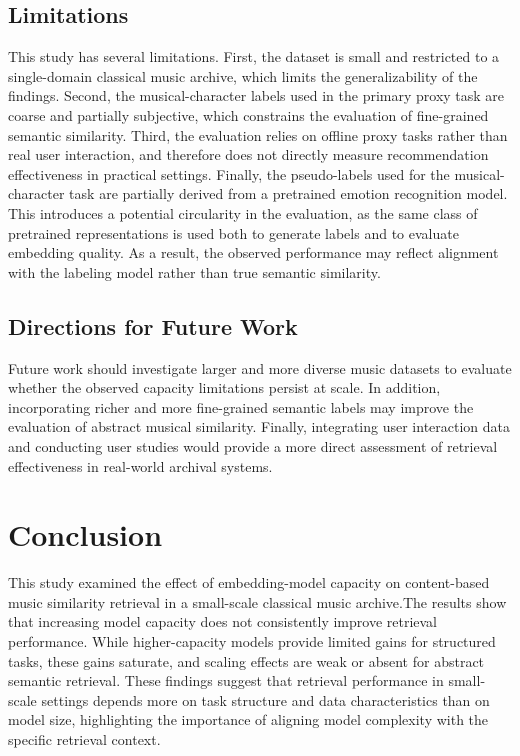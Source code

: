 \documentclass{article}
\begin{document}
\subsection{Limitations}
This study has several limitations.
First, the dataset is small and restricted to a single-domain classical music archive, which limits the generalizability of the findings.
Second, the musical-character labels used in the primary proxy task are coarse and partially subjective, which constrains the evaluation of fine-grained semantic similarity.
Third, the evaluation relies on offline proxy tasks rather than real user interaction, and therefore does not directly measure recommendation effectiveness in practical settings.
Finally, the pseudo-labels used for the musical-character task are partially derived from a pretrained emotion recognition model. This introduces a potential circularity in the evaluation, as the same class of pretrained representations is used both to generate labels and to evaluate embedding quality. As a result, the observed performance may reflect alignment with the labeling model rather than true semantic similarity.

\subsection{Directions for Future Work}
Future work should investigate larger and more diverse music datasets to evaluate whether the observed capacity limitations persist at scale.
In addition, incorporating richer and more fine-grained semantic labels may improve the evaluation of abstract musical similarity.
Finally, integrating user interaction data and conducting user studies would provide a more direct assessment of retrieval effectiveness in real-world archival systems.

\section{Conclusion}
This study examined the effect of embedding-model capacity on content-based music similarity retrieval 
in a small-scale classical music archive.The results show that increasing model capacity does not consistently 
improve retrieval performance. While higher-capacity models provide limited gains for structured tasks, these 
gains saturate, and scaling effects are weak or absent for abstract semantic retrieval. These findings suggest 
that retrieval performance in small-scale settings depends more on task structure and data characteristics 
than on model size, highlighting the importance of aligning model complexity with the specific retrieval context.


\end{document}
